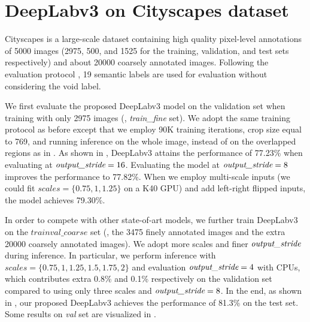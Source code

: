 \section{DeepLabv3 on Cityscapes dataset}
Cityscapes \cite{Cordts2016Cityscapes} is a large-scale dataset containing high quality pixel-level annotations of 5000 images (2975, 500, and 1525 for the training, validation, and test sets respectively) and about 20000 coarsely annotated images. Following the evaluation protocol \cite{Cordts2016Cityscapes}, 19 semantic labels are used for evaluation without considering the void label.

We first evaluate the proposed DeepLabv3 model on the validation set when training with only 2975 images (\ie, \textit{train\_fine} set). We adopt the same training protocol as before except that we employ 90K training iterations, crop size equal to 769, and running inference on the whole image, instead of on the overlapped regions as in \cite{chen2016deeplab}. As shown in , DeepLabv3 attains the performance of 77.23\% when evaluating at $\emph{output\_stride}=16$. Evaluating the model at $\emph{output\_stride}=8$ improves the performance to 77.82\%. When we employ multi-scale inputs (we could fit $scales=\{0.75, 1, 1.25\}$ on a K40 GPU) and add left-right flipped inputs, the model achieves 79.30\%.

In order to compete with other state-of-art models, we further train DeepLabv3 on the $\textit{trainval\_coarse}$ set (\ie, the 3475 finely annotated images and the extra 20000 coarsely annotated images). We adopt more scales and finer $\emph{output\_stride}$ during inference. In particular, we perform inference with $scales=\{0.75, 1, 1.25, 1.5, 1.75, 2\}$ and evaluation $\emph{output\_stride}=4$ with CPUs, which contributes extra 0.8\% and 0.1\% respectively on the validation set compared to using only three scales and $\emph{output\_stride}=8$. In the end, as shown in , our proposed DeepLabv3 achieves the performance of 81.3\% on the test set. Some results on \textit{val} set are visualized in .

